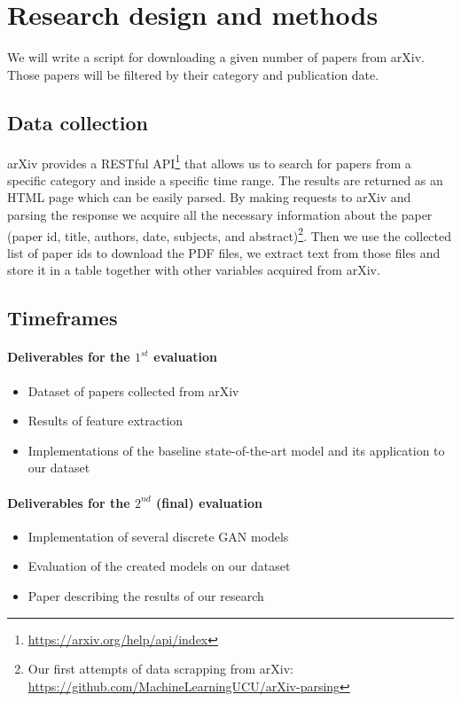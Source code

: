 \documentclass[sigplan]{acmart}
\begin{document}
\section{Research design and methods}

We will write a script for downloading a given number of papers from arXiv. Those papers will be filtered by their category and publication date.

\subsection{Data collection}

arXiv provides a RESTful API\footnote{\url{https://arxiv.org/help/api/index}} that allows us to search for papers from a specific category and inside a specific time range. The results are returned as an HTML page which can be easily parsed. By making requests to arXiv and parsing the response we acquire all the necessary information about the paper (paper id, title, authors, date, subjects, and abstract)\footnote{Our first attempts of data scrapping from arXiv:\\ \url{https://github.com/MachineLearningUCU/arXiv-parsing}}. Then we use the collected list of paper ids to download the PDF files, we extract text from those files and store it in a table together with other variables acquired from arXiv.

\subsection{Timeframes}

\paragraph{Deliverables for the $1^{st}$ evaluation}
\begin{itemize}
\item Dataset of papers collected from arXiv
\item Results of feature extraction
\item Implementations of the baseline state-of-the-art model and its application to our dataset
\end{itemize}

\paragraph{Deliverables for the $2^{nd}$ (final) evaluation}
\begin{itemize}
\item Implementation of several discrete GAN models
\item Evaluation of the created models on our dataset
\item Paper describing the results of our research
\end{itemize}
\end{document}
